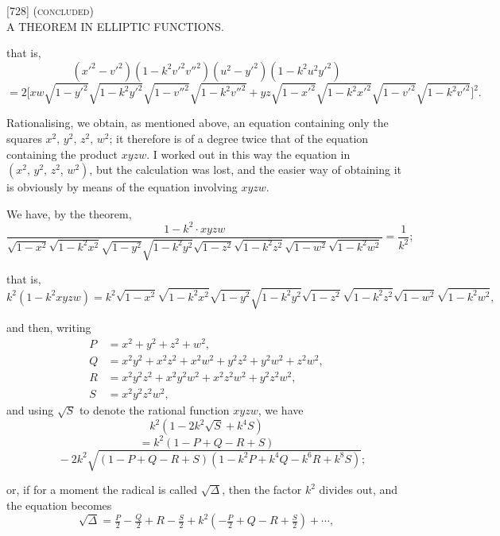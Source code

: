 \documentclass[11pt]{article}
\begin{document}
\begin{center}
\textsc{[728] (concluded)}\\[2pt]
\textsc{A THEOREM IN ELLIPTIC FUNCTIONS.}
\end{center}

\bigskip

\noindent
that is,
\[
(x'^2 - v'^2)(1 - k^2 v'^2 v''^2)(u^2 - y'^2)(1 - k^2 u^2 y'^2)
\]
\[
= 2\bigl[xw\sqrt{1-y'^2}\sqrt{1-k^2 y'^2}\sqrt{1-v''^2}\sqrt{1-k^2 v''^2} + yz\sqrt{1-x'^2}\sqrt{1-k^2 x'^2}\sqrt{1-v'^2}\sqrt{1-k^2 v'^2}\bigr]^2.
\]

\noindent
Rationalising, we obtain, as mentioned above, an equation containing only the squares
$x^2,\, y^2,\, z^2,\, w^2$; it therefore is of a degree twice that of the equation containing
the product $xyzw$. I worked out in this way the equation in $(x^2,\, y^2,\, z^2,\, w^2)$, but the
calculation was lost, and the easier way of obtaining it is obviously by means of the
equation involving $xyzw$.

\medskip

\noindent
We have, by the theorem,
\[
\frac{1 - k^2 \cdot xyzw}{\sqrt{1-x^2}\sqrt{1-k^2 x^2}\sqrt{1-y^2}\sqrt{1-k^2 y^2}\sqrt{1-z^2}\sqrt{1-k^2 z^2}\sqrt{1-w^2}\sqrt{1-k^2 w^2}} = \frac{1}{k^2};
\]

\noindent
that is,
\[
k^2(1 - k^2 xyzw) = k^2\sqrt{1-x^2}\sqrt{1-k^2 x^2}\sqrt{1-y^2}\sqrt{1-k^2 y^2}\sqrt{1-z^2}\sqrt{1-k^2 z^2}\sqrt{1-w^2}\sqrt{1-k^2 w^2},
\]

\noindent
and then, writing
\begin{align*}
P &= x^2 + y^2 + z^2 + w^2,\\
Q &= x^2 y^2 + x^2 z^2 + x^2 w^2 + y^2 z^2 + y^2 w^2 + z^2 w^2,\\
R &= x^2 y^2 z^2 + x^2 y^2 w^2 + x^2 z^2 w^2 + y^2 z^2 w^2,\\
S &= x^2 y^2 z^2 w^2,
\end{align*}
and using $\sqrt{S}$ to denote the rational function $xyzw$, we have
\[
k^2(1 - 2k^2\sqrt{S} + k^4 S)
\]
\[
= k^2(1 - P + Q - R + S)
\]
\[
\quad - 2k^2\sqrt{(1 - P + Q - R + S)(1 - k^2 P + k^4 Q - k^6 R + k^8 S)};
\]

\noindent
or, if for a moment the radical is called $\sqrt{\Delta}$, then the factor $k^2$ divides out, and
the equation becomes
\[
\sqrt{\Delta} = \tfrac{P}{2} - \tfrac{Q}{2} + R - \tfrac{S}{2} + k^2(-\tfrac{P}{2} + Q - R + \tfrac{S}{2}) + \cdots,
\]
\end{document}
